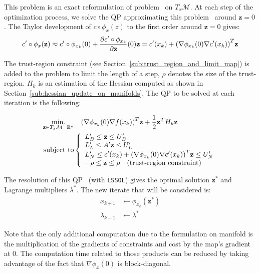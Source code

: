 This problem is an exact reformulation of problem~ on $T_x\mathcal{M}$.
At each step of the optimization process, we solve the QP approximating this problem~ around $\mathbf{z}=0$.
The Taylor development of $c\circ\phi_x(z)$ to the first order around $\mathbf{z} = 0$ gives:
\begin{equation}
  c' \circ \phi_x(\mathbf{z}) \approx c'\circ \phi_{x_k}(0) + \frac{\partial c'\circ \phi_{x_k}}{\partial {\bf z}}(0) {\bf z } = c'(x_k) + {\left(\nabla\phi_{x_k}(0) \nabla c' (x_k)\right)}^T\mathbf{z}
\end{equation}

The trust-region constraint (see Section~\ref{sub:trust_region_and_limit_map}) is added to the problem to limit the length of a step, $\rho$ denotes the size of the trust-region.
$H_k$ is an estimation of the Hessian computed as shown in Section~\ref{sub:hessian_update_on_manifolds}.
The QP to be solved at each iteration is the following:

\begin{align}
  \label{eq:QP_txm}
  \begin{split}
  \operatorname*{min.}_{\mathbf{z} \in T_x\mathcal{M}=\mathbb{R}^n } & \quad {\left(\nabla\phi_{x_k}(0) \nabla f (x_k)\right)}^T\mathbf{z} + \frac{1}{2} {\bf z }^T H_k{\bf z }\\
  \text{subject to}&\left\{
  \begin{array}{lr}
    L_B' \leq \mathbf{z} \leq U_B' \\
    L_L' \leq A' \mathbf{z} \leq U_L' \\
    L_N' \leq c'(x_k) + {\left(\nabla\phi_{x_k}(0) \nabla c' (x_k)\right)}^T\mathbf{z}\leq U_N'\\
    -\rho \leq \mathbf{z} \leq \rho \quad (\text{trust-region constraint}) \\
  \end{array}\right.
  \end{split}
\end{align}

The resolution of this QP~ (with {\tt LSSOL}) gives the optimal solution $\mathbf{z}^*$ and Lagrange multipliers $\lambda^*$.
The new iterate that will be considered is:
\begin{align}
  x_{k+1} & \leftarrow \phi_{x_k}(\mathbf{z}^*)\\
  \lambda_{k+1} & \leftarrow \lambda^*
\end{align}

Note that the only additional computation due to the formulation on manifold is the multiplication of the gradients of constraints and cost by the map's gradient at $0$.
The computation time related to those products can be reduced by taking advantage of the fact that $\nabla \phi_x(0)$ is block-diagonal.

